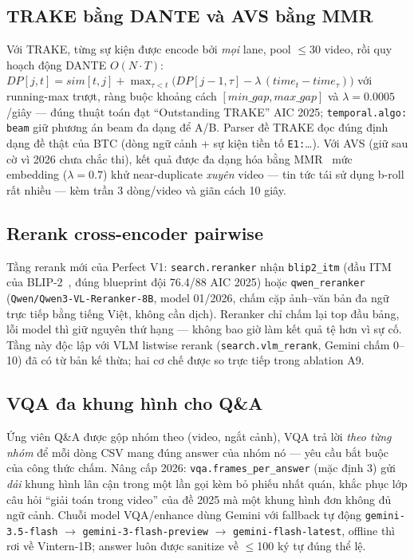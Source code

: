 \documentclass{ai_conquer2026}
\begin{document}
\subsection{TRAKE bằng DANTE và AVS bằng MMR}
Với TRAKE, từng sự kiện được encode bởi \emph{mọi} lane, pool $\le$30 video, rồi quy hoạch
động DANTE $O(N\cdot T)$: $DP[j,t] = sim[t,j] + \max_{\tau<t}\bigl(DP[j{-}1,\tau] -
\lambda\,(time_t - time_\tau)\bigr)$ với running-max trượt, ràng buộc khoảng cách
$[min\_gap, max\_gap]$ và $\lambda = 0.0005$/giây --- đúng thuật toán đạt ``Outstanding
TRAKE'' AIC 2025; \texttt{temporal.algo: beam} giữ phương án beam đa dạng để A/B. Parser đề
TRAKE đọc đúng định dạng đề thật của BTC (dòng ngữ cảnh + sự kiện tiền tố \texttt{E1:}\ldots).
Với AVS (giữ sau cờ vì 2026 chưa chắc thi), kết quả được đa dạng hóa bằng
MMR~\cite{carbonell1998mmr} mức embedding ($\lambda=0.7$) khử near-duplicate \emph{xuyên}
video --- tin tức tái sử dụng b-roll rất nhiều --- kèm trần 3 dòng/video và giãn cách 10 giây.

\subsection{Rerank cross-encoder pairwise}
Tầng rerank mới của Perfect V1: \texttt{search.reranker} nhận \texttt{blip2\_itm}
(đầu ITM của BLIP-2~\cite{li2023blip2}, đúng blueprint đội 76.4/88 AIC 2025) hoặc
\texttt{qwen\_reranker} (\texttt{Qwen/Qwen3-VL-Reranker-8B}, model 01/2026, chấm cặp
ảnh--văn bản đa ngữ trực tiếp bằng tiếng Việt, không cần dịch). Reranker chỉ chấm lại
top đầu bảng, lỗi model thì giữ nguyên thứ hạng --- không bao giờ làm kết quả tệ hơn vì
sự cố. Tầng này độc lập với VLM listwise rerank (\texttt{search.vlm\_rerank}, Gemini chấm
0--10) đã có từ bản kế thừa; hai cơ chế được so trực tiếp trong ablation A9.

\subsection{VQA đa khung hình cho Q\&A}
Ứng viên Q\&A được gộp nhóm theo (video, ngắt cảnh), VQA trả lời \emph{theo từng nhóm} để
mỗi dòng CSV mang đúng answer của nhóm nó --- yêu cầu bắt buộc của công thức chấm. Nâng cấp
2026: \texttt{vqa.frames\_per\_answer} (mặc định 3) gửi \emph{dải} khung hình lân cận trong
một lần gọi kèm bỏ phiếu nhất quán, khắc phục lớp câu hỏi ``giải toán trong video'' của đề
2025 mà một khung hình đơn không đủ ngữ cảnh. Chuỗi model VQA/enhance dùng Gemini với
fallback tự động \texttt{gemini-3.5-flash} $\rightarrow$ \texttt{gemini-3-flash-preview}
$\rightarrow$ \texttt{gemini-flash-latest}, offline thì rơi về Vintern-1B; answer luôn được
sanitize về $\le$100 ký tự đúng thể lệ.
\end{document}
